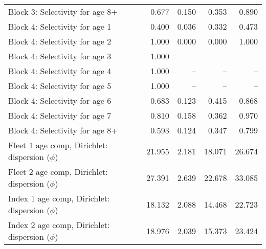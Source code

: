 \documentclass[
]{article}
\begin{document}
\begin{landscape}
\begin{longtable}[t]{lrrrr}
\addlinespace
Block 3: Selectivity for age 8+ & 0.677 & 0.150 & 0.353 & 0.890\\
Block 4: Selectivity for age 1 & 0.400 & 0.036 & 0.332 & 0.473\\
Block 4: Selectivity for age 2 & 1.000 & 0.000 & 0.000 & 1.000\\
Block 4: Selectivity for age 3 & 1.000 & -- & -- & --\\
Block 4: Selectivity for age 4 & 1.000 & -- & -- & --\\
\addlinespace
Block 4: Selectivity for age 5 & 1.000 & -- & -- & --\\
Block 4: Selectivity for age 6 & 0.683 & 0.123 & 0.415 & 0.868\\
Block 4: Selectivity for age 7 & 0.810 & 0.158 & 0.362 & 0.970\\
Block 4: Selectivity for age 8+ & 0.593 & 0.124 & 0.347 & 0.799\\
Fleet 1 age comp, Dirichlet: dispersion ($\phi$) & 21.955 & 2.181 & 18.071 & 26.674\\
\addlinespace
Fleet 2 age comp, Dirichlet: dispersion ($\phi$) & 27.391 & 2.639 & 22.678 & 33.085\\
Index 1 age comp, Dirichlet: dispersion ($\phi$) & 18.132 & 2.088 & 14.468 & 22.723\\
Index 2 age comp, Dirichlet: dispersion ($\phi$) & 18.976 & 2.039 & 15.373 & 23.424\\*
\end{longtable}
\end{landscape}
\end{document}
